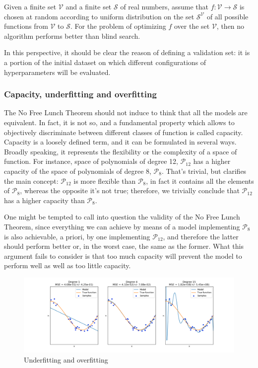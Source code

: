 \documentclass[a4paper, twoside]{article}
\begin{document}
        \begin{displayquote}
            Given a finite set $\mathcal{V}$ and a finite set $\mathcal{S}$ of real numbers, assume that $f:\mathcal{V}\rightarrow\mathcal{S}$ is chosen at random according to uniform distribution on the set $\mathcal{S}^{\mathcal{V}}$ of all possible functions from $\mathcal{V}$ to $\mathcal{S}$. For the problem of optimizing $f$ over the set $\mathcal{V}$, then no algorithm performs better than blind search.
        \end{displayquote}

        In this perspective, it should be clear the reason of defining a validation set: it is a portion of the initial dataset on which different configurations of hyperparameters will be evaluated.


        \subsubsection{Capacity, underfitting and overfitting}

        The No Free Lunch Theorem should not induce to think that all the models are equivalent. In fact, it is not so, and a fundamental property which allows to objectively discriminate between different classes of function is called capacity. Capacity is a loosely defined term, and it can be formulated in several ways. Broadly speaking, it represents the flexibility or the complexity of a space of function. For instance, space of polynomials of degree 12, $\mathcal{P}_{12}$ has a higher capacity of the space of polynomials of degree 8, $\mathcal{P}_8$. That's trivial, but clarifies the main concept: $\mathcal{P}_{12}$ is more flexible than $\mathcal{P}_8$, in fact it contains all the elements of $\mathcal{P}_8$, whereas the opposite it's not true; therefore, we trivially conclude that $\mathcal{P}_{12}$ has a higher capacity than $\mathcal{P}_8$.

        One might be tempted to call into question the validity of the No Free Lunch Theorem, since everything we can achieve by means of a model implementing $\mathcal{P}_8$ is also achievable, a priori, by one implementing $\mathcal{P}_{1 2}$, and therefore the latter should perform better or, in the worst case, the same as the former. What this argument fails to consider is that too much capacity will prevent the model to perform well as well as too little capacity.

        \begin{figure}[H]
            \centering
            \includegraphics[scale=0.4]{underover.png}
            \caption{Underfitting and overfitting}
            \label{fig:underover}
        \end{figure}
\end{document}
